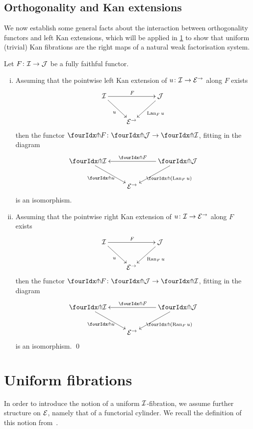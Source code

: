 \documentclass[reqno,10pt,a4paper,oneside,draft]{amsart}
\begin{document}
\medskip



\subsection*{Orthogonality and Kan extensions} We now establish some general facts about the interaction between orthogonality functors and left Kan extensions, which will be applied in \cref{sec:unif} to show that uniform (trivial) Kan fibrations are the right maps of a natural weak factorisation system.

\begin{proposition} \label{kan-extension-closure}
Let $F \co \cal{I} \to \cal{J}$ be a fully faithful functor.
\begin{enumerate}[(i)]
\item Assuming that the pointwise left Kan extension of $u \co \cal{I} \to \catE^\to$ along $F$ exists
\[
\xymatrix{
  \cal{I}
  \ar[dr]_{u}
  \ar[rr]^{F}
&&
  \cal{J}
  \ar[dl]^{\Lan_F u}
\\&
  \catE^\to
}
\]
then the functor $\liftr{F} \co \liftr{\cal{J}} \to \liftr{\cal{I}}$, fitting in the diagram
\[
\xymatrix{
  \liftr{\cal{I}}
  \ar[dr]_{\liftr{u}}
&&
  \liftr{\cal{J}}
  \ar[ll]_{\liftr{F}}
  \ar[dl]^{\liftr{(\Lan_F u)}}
\\&
  \catE^\to
}
\]
is an isomorphism.
\item Assuming that the pointwise right Kan extension of $u \co \cal{I} \to \catE^\to$ along $F$ exists
\[
\xymatrix{
  \cal{I}
  \ar[dr]_{u}
  \ar[rr]^{F}
&&
  \cal{J}
  \ar[dl]^{\Ran_F u}
\\&
  \catE^\to
}
\]
then the functor $\liftl{F} \co \liftl{\cal{J}} \to \liftl{\cal{I}}$, fitting in the diagram
\[
\xymatrix{
  \liftl{\cal{I}}
  \ar[dr]_{\liftl{u}}
&&
  \liftl{\cal{J}}
  \ar[ll]_{\liftl{F}}
  \ar[dl]^{\liftl{(\Ran_F u)}}
\\&
  \catE^\to
}
\]
is an isomorphism.
\qed
\end{enumerate}
\end{proposition}



\section{Uniform fibrations}
\label{sec:unif}



In order to introduce the notion of a uniform $\cal{I}$-fibration, we assume further structure on $\catE$, namely that of a functorial cylinder.
We recall the definition of this notion from~\cite{kamps-porter:homotopy}.
\end{document}
